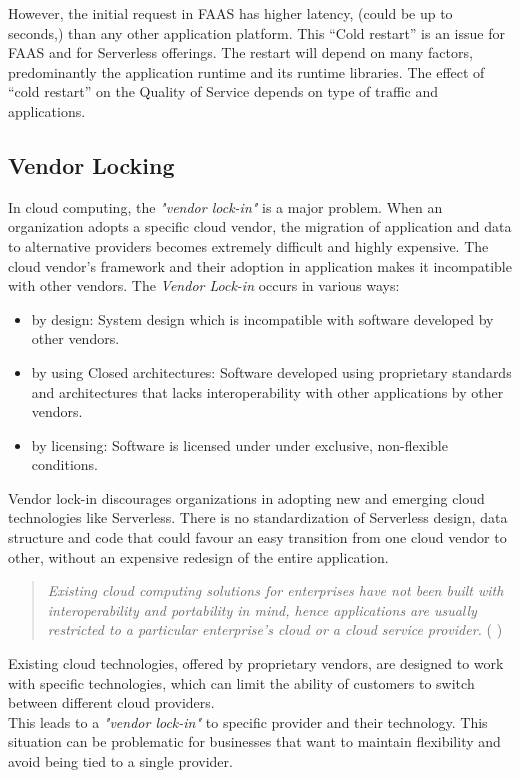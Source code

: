 \documentclass{article}
\begin{document}
\begin{flushleft}
However, the initial request in \gls{FAAS} has higher latency, (could be up to seconds,) than any other application platform. This “Cold restart” is an issue for \gls{FAAS} and for Serverless offerings. The restart will depend on many factors, predominantly the application runtime and its runtime libraries. The effect of “cold restart” on the Quality of Service depends on type of traffic and applications. 

\subsection{Vendor Locking}
In cloud computing, the \textit{"vendor lock-in"} is a major problem. When an organization adopts a specific cloud vendor, the migration of application and data to alternative providers becomes extremely difficult and highly expensive. The cloud vendor's framework and their adoption in application makes it incompatible with other vendors.
 The \textit{Vendor Lock-in} occurs in various ways: 
 \begin{itemize}
     \item by design: System design which is incompatible with software developed by other vendors.
     \item by using Closed architectures: Software developed using proprietary standards and  architectures that lacks interoperability with other applications by other vendors.
     \item by licensing: Software is licensed under under exclusive, non-flexible conditions.
 \end{itemize}

 Vendor lock-in discourages organizations in adopting new and emerging cloud technologies like Serverless. There is no standardization of Serverless design, data structure and code that could favour an easy transition from one cloud vendor to other, without an expensive redesign of the entire application. 

 \begin{quote}
 \textit{
Existing cloud computing solutions for enterprises have not been built with interoperability and portability in mind, hence applications are usually restricted to a particular enterprise's cloud or a cloud service provider.}  
( \cite{Opara-Martins-2014} )
\end{quote}
\par 
Existing cloud technologies, offered by proprietary vendors, are designed to work with specific technologies, which can limit the ability of customers to switch between different cloud providers.
\\
This leads to a \textit{"vendor lock-in"} to specific provider and their technology. This  situation can be problematic for businesses that want to maintain flexibility and avoid being tied to a single provider.
\end{flushleft}
\end{document}
